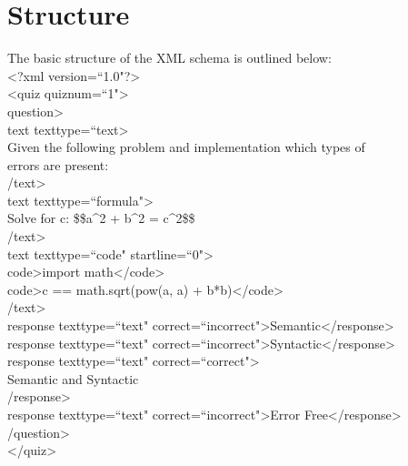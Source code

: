 \documentclass{article}
\begin{document}
	\section{Structure}
	The basic structure of the XML schema is outlined below:\vspace{1ex}\\
	{\textless}?xml version=``1.0"?{\textgreater}\\	
	{\textless}quiz quiznum=``1"{\textgreater}\\	
	\phantom{3em}{\textless}question{\textgreater}\\	
	\phantom{3em}\phantom{3em}{\textless}text texttype=``text{\textgreater}\\
	\phantom{3em}\phantom{3em}\phantom{3em}Given the following problem and implementation which types of\\
	\phantom{3em}\phantom{3em}\phantom{3em}errors are present:\\
	\phantom{3em}\phantom{3em}{\textless}/text{\textgreater}\\	
	\phantom{3em}\phantom{3em}{\textless}text texttype=``formula"{\textgreater}\\
	\phantom{3em}\phantom{3em}\phantom{3em}Solve for c: \$\$a{\textasciicircum}2 + b{\textasciicircum}2 = c{\textasciicircum}2\$\$\\
	\phantom{3em}\phantom{3em}{\textless}/text{\textgreater}\\	
	\phantom{3em}\phantom{3em}{\textless}text texttype=``code" startline=``0"{\textgreater}\\	
	\phantom{3em}\phantom{3em}\phantom{3em}{\textless}code{\textgreater}import math{\textless}/code{\textgreater}\\	
	\phantom{3em}\phantom{3em}\phantom{3em}{\textless}code{\textgreater}c == math.sqrt(pow(a, a) + b*b){\textless}/code{\textgreater}\\
	\phantom{3em}\phantom{3em}{\textless}/text{\textgreater}\\
	\phantom{3em}\phantom{3em}{\textless}response texttype=``text" correct=``incorrect"{\textgreater}Semantic{\textless}/response{\textgreater}\\	
	\phantom{3em}\phantom{3em}{\textless}response texttype=``text" correct=``incorrect"{\textgreater}Syntactic{\textless}/response{\textgreater}\\
	\phantom{3em}\phantom{3em}{\textless}response texttype=``text" correct=``correct"{\textgreater}\\
	\phantom{3em}\phantom{3em}\phantom{3em}Semantic and Syntactic\\
	\phantom{3em}\phantom{3em}{\textless}/response{\textgreater}\\
	\phantom{3em}\phantom{3em}{\textless}response texttype=``text" correct=``incorrect"{\textgreater}Error Free{\textless}/response{\textgreater}\\	
	\phantom{3em}{\textless}/question{\textgreater}\\
	{\textless}/quiz{\textgreater}
	
\end{document}
